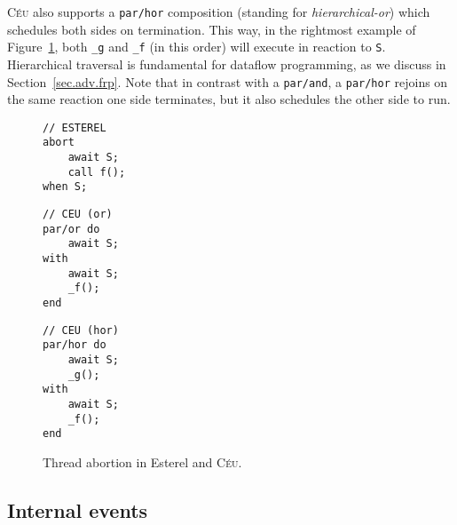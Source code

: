 \documentclass{acm_proc_article-sp}
\newcommand{\CEU}{\textsc{C\'{e}u}\xspace}
\newcommand{\code}[1] {{\small{\texttt{#1}}}}
\newcommand{\1}{\;}
\newcommand{\2}{\;\;}
\newcommand{\3}{\;\;\;}
\newcommand{\5}{\;\;\;\;\;}
\begin{document}
\CEU also supports a \code{par/hor} composition (standing for 
\emph{hierarchical-or}) which schedules both sides on termination.
This way, in the rightmost example of Figure~\ref{lst.abortion}, both 
\code{\_g} and \code{\_f} (in this order) will execute in reaction to \code{S}.
Hierarchical traversal is fundamental for dataflow programming, as we discuss 
in Section~\ref{sec.adv.frp}.
Note that in contrast with a \code{par/and}, a \code{par/hor} rejoins on the 
same reaction one side terminates, but it also schedules the other side to run.

\begin{figure}[h]
\begin{minipage}[t]{0.32\linewidth}
\begin{lstlisting}
// ESTEREL
abort
    await S;
    call f();
when S;
\end{lstlisting}
\end{minipage}
%
\begin{minipage}[t]{0.32\linewidth}
\begin{lstlisting}
// CEU (or)
par/or do
    await S;
with
    await S;
    _f();
end
\end{lstlisting}
\end{minipage}
%
\begin{minipage}[t]{0.32\linewidth}
\begin{lstlisting}
// CEU (hor)
par/hor do
    await S;
    _g();
with
    await S;
    _f();
end
\end{lstlisting}
\end{minipage}
\caption{ Thread abortion in Esterel and \CEU. %
\label{lst.abortion}
}
\end{figure}
\begin{comment}
{\small
With strong abortion (default in Esterel), the call to \code{f1} is not 
executed (the \code{abort} can instead be prefixed with the \code{weak} 
keyword).
In \CEU, the \code{par/xor} provides strong and weak abortion depending on the 
chosen order for the trails.
The \code{par/or} provides XXX.
}
\end{comment}



\subsection{Internal events}
\label{sec.ceu.ints}
\end{document}

